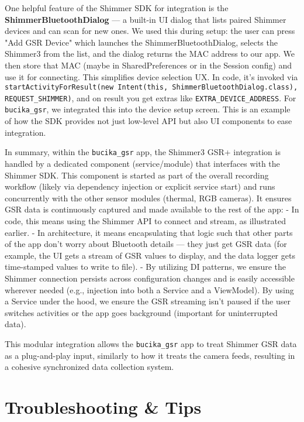 {{One helpful feature of the Shimmer SDK for integration is the
\textbf{ShimmerBluetoothDialog} --- a built-in UI dialog that lists paired
Shimmer devices and can scan for new
ones\cite{ref38}.
We used this during setup: the user can press "Add GSR Device" which
launches the ShimmerBluetoothDialog, selects the Shimmer3 from the list,
and the dialog returns the MAC address to our
app\cite{ref39}.
We then store that MAC (maybe in SharedPreferences or in the Session
config) and use it for connecting. This simplifies device selection UX.
In code, it's invoked via
\texttt{startActivityForResult(new Intent(this, ShimmerBluetoothDialog.class), REQUEST_SHIMMER)},
and on result you get extras like \texttt{EXTRA_DEVICE_ADDRESS}. For
\texttt{bucika_gsr}, we integrated this into the device setup screen. This is
an example of how the SDK provides not just low-level API but also UI
components to ease integration.

In summary, within the \texttt{bucika_gsr} app, the Shimmer3 GSR+ integration
is handled by a dedicated component (service/module) that interfaces
with the Shimmer SDK. This component is started as part of the overall
recording workflow (likely via dependency injection or explicit service
start) and runs concurrently with the other sensor modules (thermal, RGB
cameras). It ensures GSR data is continuously captured and made
available to the rest of the app: - In code, this means using the
Shimmer API to connect and stream, as illustrated earlier. - In
architecture, it means encapsulating that logic such that other parts of
the app don't worry about Bluetooth details --- they just get GSR data
(for example, the UI gets a stream of GSR values to display, and the
data logger gets time-stamped values to write to file). - By utilizing
DI patterns, we ensure the Shimmer connection persists across
configuration changes and is easily accessible wherever needed (e.g.,
injection into both a Service and a ViewModel). By using a Service under
the hood, we ensure the GSR streaming isn't paused if the user switches
activities or the app goes background (important for uninterrupted
data).

This modular integration allows the \texttt{bucika_gsr} app to treat Shimmer
GSR data as a plug-and-play input, similarly to how it treats the camera
feeds, resulting in a cohesive synchronized data collection system.

\section{Troubleshooting & Tips}

}}
